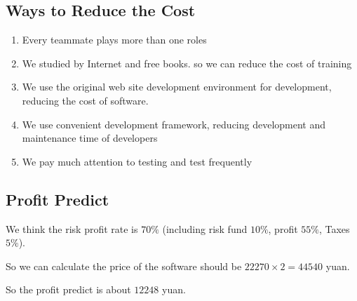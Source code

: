 \documentclass[a4paper,11pt]{article}
\begin{document}
\subsection{Ways to Reduce the Cost}
\begin{enumerate}
\item Every teammate plays more than one roles 
\item We studied by Internet and free books. so we can reduce the cost of training
\item We use the original web site development environment for development, reducing the cost of software.
\item We use convenient development framework, reducing development and maintenance time of developers
\item We pay much attention to testing and test frequently
\end{enumerate}

\subsection{Profit Predict}
We think the risk profit rate is \(70\%\) (including risk fund \(10\%\), profit \(55\%\), Taxes \(5\%\)).

So we can calculate the price of the software should be \(22270 \times 2 = 44540\) yuan.

So the profit predict is about \(12248\) yuan. 
\end{document}

